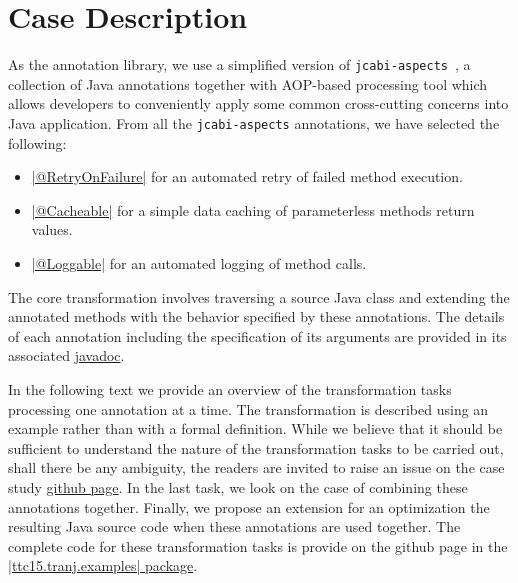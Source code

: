 
\section{Case Description}
\label{sec:Description}

As the annotation library, we use a simplified version of \texttt{jcabi-aspects}~\cite{jcabi}, a collection of Java annotations together with AOP-based processing tool which allows developers to conveniently apply some common cross-cutting concerns into Java application.
From all the \texttt{jcabi-aspects} annotations, we have selected the following:

\begin{itemize}[--]
  \item \href{https://github.com/fikovnik/ttc15-tranj-case/blob/master/src/ttc15-tranj/src/main/java/ttc15/tranj/annotation/RetryOnFailure.java}{\javainline|@RetryOnFailure|} for an automated retry of failed method execution.
  \item \href{https://github.com/fikovnik/ttc15-tranj-case/blob/master/src/ttc15-tranj/src/main/java/ttc15/tranj/annotation/Cacheable.java}{\javainline|@Cacheable|} for a simple data caching of parameterless methods return values.
  \item \href{https://github.com/fikovnik/ttc15-tranj-case/blob/master/src/ttc15-tranj/src/main/java/ttc15/tranj/annotation/Loggable.java}{\javainline|@Loggable|} for an automated logging of method calls.
\end{itemize}

The core transformation involves traversing a source Java class and extending the annotated methods with the behavior specified by these annotations.
The details of each annotation including the specification of its arguments are provided in its associated \href{https://github.com/fikovnik/ttc15-tranj-case/tree/master/src/ttc15-tranj/src/main/java/ttc15/tranj/annotation}{javadoc}.

In the following text we provide an overview of the transformation tasks processing one annotation at a time.
The transformation is described using an example rather than with a formal definition.
While we believe that it should be sufficient to understand the nature of the transformation tasks to be carried out, shall there be any ambiguity, the readers are invited to raise an issue on the case study \href{https://github.com/fikovnik/ttc15-tranj-case}{github page}.
In the last task, we look on the case of combining these annotations together.
Finally, we propose an extension for an optimization the resulting Java source code when these annotations are used together.
%
The complete code for these transformation tasks is provide on the github page in the \href{https://github.com/fikovnik/ttc15-tranj-case/tree/master/src/ttc15-tranj/src/main/java/ttc15/tranj/examples}{\javainline|ttc15.tranj.examples| package}.

